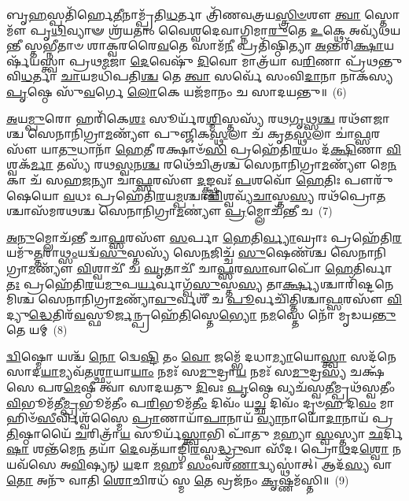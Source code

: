 𑌬𑍃\-\ul{𑌹}\-𑌸𑍍𑌪𑌤𑌿᳴𑌰𑍍\mbox{}𑌹𑍇\-\ul{𑌤𑍀}\-𑌨𑌾𑌮𑍍𑌪𑍍𑌰᳴𑌤𑌿\-\ul{𑌧}\-𑌰𑍍𑌤𑌾 𑌤𑍍𑌰𑌿᳴𑌣𑌵𑌤𑍍𑌰𑌯\-\ul{𑌸𑍍𑌤𑍍𑌰𑌿}\-\-\ul{𑍞}\-𑌶𑍗 \ul{𑌤𑍍𑌵𑌾} 𑌸𑍍𑌤𑍋𑌮𑍗᳴ 𑌪𑍃\-\ul{𑌥𑌿}\-𑌵𑍍𑌯𑌾𑍟 𑌶𑍍𑌰᳴𑌯𑌤𑌾𑌂 𑌵𑍈𑌶𑍍𑌵𑌦𑍇𑌵𑌾𑌗𑍍𑌨𑌿𑌮𑌾\-\ul{𑌰𑍁}\-𑌤𑍇 \ul{𑌉}\-𑌕𑍍𑌥𑍇 𑌅𑌵𑍍𑌯᳴𑌥𑌯𑌨𑍍𑌤𑍀 𑌸𑍍𑌤𑌭𑍍𑌨𑍀𑌤𑌾𑍞 𑌶𑌾𑌕𑍍𑌵𑌰𑌰𑍈\-\ul{𑌵}\-𑌤𑍇 𑌸𑌾𑌮᳴\-\ul{𑌨𑍀} 𑌪𑍍𑌰𑌤𑌿᳴𑌷𑍍𑌠𑌿𑌤𑍍𑌯𑌾 \ul{𑌅}\-𑌨𑍍𑌤𑌰𑌿᳴\-\ul{𑌕𑍍𑌷𑌾}\-𑌯𑌰𑍍\mbox{}𑌷᳴𑌯𑌸𑍍𑌤𑍍𑌵𑌾 𑌪𑍍𑌰𑌥\-\ul{𑌮}\-𑌜𑌾 \ul{𑌦𑍇}\-𑌵𑍇𑌷𑍁᳴ \ul{𑌦𑌿}\-𑌵𑍋 𑌮𑌾𑌤𑍍𑌰᳴𑌯𑌾 𑌵\-\ul{𑌰𑌿}\-𑌣𑌾 𑌪𑍍𑌰᳴𑌥𑌨𑍍𑌤𑍁 𑌵𑌿\-\ul{𑌧}\-𑌰𑍍𑌤𑌾 \ul{𑌚𑌾}\-𑌯𑌮𑌧𑌿᳴𑌪𑌤𑌿\-\ul{𑌶𑍍𑌚} 𑌤𑍇 \ul{𑌤𑍍𑌵𑌾} 𑌸𑌰𑍍𑌵𑍇᳴ 𑌸𑌂𑌵𑌿\-\ul{𑌦𑌾}\-𑌨𑌾 𑌨𑌾𑌕᳴𑌸𑍍𑌯 \ul{𑌪𑍃}\-𑌷𑍍𑌠𑍇 𑌸𑍁᳴\-\ul{𑌵}\-𑌰𑍍𑌗𑍇 \ul{𑌲𑍋}\-𑌕𑍇 𑌯𑌜᳴𑌮𑌾𑌨𑌂 𑌚 𑌸𑌾𑌦𑌯𑌨𑍍𑌤𑍁॥~(6)

{\anuvakamend[{\-\ul{𑌪𑍍𑌰}\-𑌤𑍀\-\ul{𑌚𑍀} 𑌦𑌿\-\ul{𑌙𑍍𑌮}\-𑌰𑍁𑌤᳴𑌸𑍍𑌤𑍇 \ul{𑌦𑍇}\-𑌵𑌾 𑌅𑌧𑌿᳴𑌪𑌤𑌯𑌶𑍍𑌚𑌤𑍍𑌵𑌾\-\ul{𑌰𑌿}\-\-\ul{𑍞}\-𑌶𑌚𑍍𑌚᳴}]}%

\-\ul{𑌅}\-𑌯\-\ul{𑌮𑍍𑌪𑍁}\-𑌰𑍋 𑌹𑌰𑌿᳴𑌕𑍇\-\ul{𑌶𑌃} 𑌸𑍂𑌰𑍍𑌯᳴𑌰\-\ul{𑌶𑍍𑌮𑌿}\-𑌸𑍍𑌤𑌸𑍍𑌯᳴ 𑌰𑌥\-\ul{𑌗𑍃}\-𑌥𑍍𑌸\-\ul{𑌶𑍍𑌚} 𑌰𑌥𑍗᳴𑌜𑌾𑌶𑍍𑌚 𑌸𑍇𑌨𑌾𑌨𑌿𑌗𑍍𑌰𑌾\-\ul{𑌮}\-𑌣𑍍𑌯𑍗᳴ 𑌪𑍁𑌞𑍍𑌜𑌿𑌕\-\ul{𑌸𑍍𑌥}\-𑌲𑌾 𑌚᳴ 𑌕𑍃𑌤\-\ul{𑌸𑍍𑌥}\-𑌲𑌾 𑌚𑌾॑\-\ul{𑌫𑍍𑌸}\-𑌰𑌸𑍗᳴ 𑌯𑌾\-\ul{𑌤𑍁}\-𑌧𑌾𑌨𑌾᳴ \ul{𑌹𑍇}\-𑌤𑍀 𑌰𑌕𑍍𑌷𑌾𑍞᳴\-\ul{𑌸𑌿} 𑌪𑍍𑌰𑌹𑍇᳴𑌤𑌿\-\ul{𑌰}\-𑌯𑌂 𑌦᳴\-\ul{𑌕𑍍𑌷𑌿}\-𑌣𑌾 \ul{𑌵𑌿}\-𑌶𑍍𑌵𑌕᳴\-\ul{𑌰𑍍𑌮𑌾} 𑌤𑌸𑍍𑌯᳴ 𑌰𑌥\-\ul{𑌸𑍍𑌵}\-𑌨\-\ul{𑌶𑍍𑌚} 𑌰𑌥𑍇᳴𑌚𑌿𑌤𑍍𑌰𑌶𑍍𑌚 𑌸𑍇𑌨𑌾𑌨𑌿𑌗𑍍𑌰𑌾\-\ul{𑌮}\-𑌣𑍍𑌯𑍗᳴ 𑌮𑍇\-\ul{𑌨}\-𑌕𑌾 𑌚᳴ 𑌸𑌹\-\ul{𑌜}\-𑌨𑍍𑌯𑌾 𑌚𑌾॑\-\ul{𑌫𑍍𑌸}\-𑌰𑌸𑍗᳴ \ul{𑌦}\-𑌙𑍍𑌕𑍍𑌷𑍍𑌣𑌵𑌃᳴ \ul{𑌪}\-𑌶𑌵𑍋᳴ \ul{𑌹𑍇}\-𑌤𑌿𑌃 𑌪𑍗𑌰𑍁᳴𑌷𑍇𑌯𑍋 \ul{𑌵}\-𑌧𑌃 𑌪𑍍𑌰𑌹𑍇᳴𑌤𑌿\-\ul{𑌰}\-𑌯\-\ul{𑌮𑍍𑌪}\-𑌶𑍍𑌚𑌾\-\ul{𑌦𑍍𑌵𑌿}\-𑌶𑍍𑌵𑌵𑍍𑌯᳴\-\ul{𑌚𑌾}\-𑌸𑍍𑌤\-\ul{𑌸𑍍𑌯} 𑌰𑌥᳴𑌪𑍍𑌰𑍋\-\ul{𑌤}\-𑌶𑍍𑌚𑌾𑌸᳴𑌮𑌰𑌥𑌶𑍍𑌚 𑌸𑍇𑌨𑌾𑌨𑌿𑌗𑍍𑌰𑌾\-\ul{𑌮}\-𑌣𑍍𑌯𑍗॑ \ul{𑌪𑍍𑌰}\-𑌮𑍍𑌲𑍋𑌚᳴𑌨𑍍𑌤𑍀 𑌚~(7)

\-\ul{𑌅}\-\-\ul{𑌨𑍁}\-𑌮𑍍𑌲𑍋𑌚᳴𑌨𑍍𑌤𑍀 𑌚𑌾\-\ul{𑌫𑍍𑌸}\-𑌰𑌸𑍗᳴ \ul{𑌸}\-𑌰𑍍𑌪𑌾 \ul{𑌹𑍇}\-𑌤𑌿\-\ul{𑌰𑍍𑌵𑍍𑌯𑌾}\-𑌘𑍍𑌰𑌾𑌃 𑌪𑍍𑌰𑌹𑍇᳴𑌤𑌿\-\ul{𑌰}\-𑌯𑌮𑍁᳴\-\ul{𑌤𑍍𑌤}\-𑌰𑌾\-\ul{𑌥𑍍𑌸𑌂}\-𑌯𑌦𑍍𑌵᳴\-\ul{𑌸𑍁}\-𑌸𑍍𑌤𑌸𑍍𑌯᳴ 𑌸𑍇\-\ul{𑌨}\-𑌜𑌿𑌚𑍍𑌚᳴ \ul{𑌸𑍁}\-𑌷𑍇𑌣᳴𑌶𑍍𑌚 𑌸𑍇𑌨𑌾𑌨𑌿𑌗𑍍𑌰𑌾\-\ul{𑌮}\-𑌣𑍍𑌯𑍗᳴ \ul{𑌵𑌿}\-𑌶𑍍𑌵𑌾𑌚𑍀᳴ 𑌚 \ul{𑌘𑍃}\-𑌤𑌾𑌚𑍀᳴ 𑌚𑌾\-\ul{𑌫𑍍𑌸}\-𑌰\-\ul{𑌸𑌾}\-𑌵𑌾𑌪𑍋᳴ \ul{𑌹𑍇}\-𑌤𑌿𑌰𑍍𑌵𑌾\-\ul{𑌤𑌃} 𑌪𑍍𑌰𑌹𑍇᳴𑌤𑌿\-\ul{𑌰}\-𑌯\-\ul{𑌮𑍁}\-𑌪\-\ul{𑌰𑍍𑌯}\-𑌰𑍍𑌵𑌾𑌗𑍍𑌵᳴\-\ul{𑌸𑍁}\-𑌸𑍍𑌤\-\ul{𑌸𑍍𑌯} 𑌤𑌾\-\ul{𑌰𑍍𑌕𑍍𑌷𑍍𑌯}\-𑌶𑍍𑌚𑌾𑌰𑌿᳴𑌷𑍍𑌟𑌨𑍇𑌮𑌿𑌶𑍍𑌚 𑌸𑍇𑌨𑌾𑌨𑌿𑌗𑍍𑌰𑌾\-\ul{𑌮}\-𑌣𑍍𑌯𑌾᳴\-\-\ul{𑌵𑍁}\-𑌰𑍍𑌵𑌶𑍀᳴ 𑌚 \ul{𑌪𑍂}\-𑌰𑍍𑌵𑌚𑌿᳴𑌤𑍍𑌤𑌿𑌶𑍍𑌚𑌾\-\ul{𑌫𑍍𑌸}\-𑌰𑌸𑍗᳴ \ul{𑌵𑌿}\-𑌦𑍍𑌯𑍁\-\ul{𑌦𑍍𑌧𑍇}\-𑌤𑌿𑌰᳴\-\ul{𑌵}\-𑌸𑍍𑌫𑍂\-\ul{𑌰𑍍𑌜}\-𑌨𑍍𑌪𑍍𑌰𑌹𑍇᳴\-\ul{𑌤𑌿}\-𑌸𑍍𑌤𑍇\-\ul{𑌭𑍍𑌯𑍋} 𑌨\-\ul{𑌮}\-𑌸𑍍𑌤𑍇 𑌨𑍋᳴ 𑌮𑍃𑌡𑌯\-\ul{𑌨𑍍𑌤𑍁} 𑌤𑍇 𑌯𑌮𑍍~(8)

\-\ul{𑌦𑍍𑌵𑌿}\-𑌷𑍍𑌮𑍋 𑌯𑌶𑍍𑌚᳴ \ul{𑌨𑍋} 𑌦𑍍𑌵𑍇\-\ul{𑌷𑍍𑌟𑌿} 𑌤𑌂 \ul{𑌵𑍋} 𑌜𑌮𑍍𑌭𑍇᳴ 𑌦𑌧𑌾\-\ul{𑌮𑍍𑌯𑌾}\-𑌯𑍋\-\ul{𑌸𑍍𑌤𑍍𑌵𑌾} 𑌸𑌦᳴𑌨𑍇 𑌸𑌾𑌦\-\ul{𑌯𑌾}\-𑌮𑍍𑌯𑌵᳴𑌤\-\ul{𑌶𑍍𑌛𑌾}\-𑌯𑌾\-\ul{𑌯𑌾𑌂} 𑌨𑌮𑌃᳴ 𑌸\-\ul{𑌮𑍁}\-𑌦𑍍𑌰𑌾\-\ul{𑌯} 𑌨𑌮𑌃᳴ 𑌸\-\ul{𑌮𑍁}\-𑌦𑍍𑌰\-\ul{𑌸𑍍𑌯} 𑌚𑌕𑍍𑌷᳴𑌸𑍇 𑌪𑌰\-\ul{𑌮𑍇}\-𑌷𑍍𑌠𑍀 𑌤𑍍𑌵𑌾᳴ 𑌸𑌾𑌦𑌯𑌤𑍁 \ul{𑌦𑌿}\-𑌵𑌃 \ul{𑌪𑍃}\-𑌷𑍍𑌠𑍇 𑌵𑍍𑌯𑌚᳴𑌸𑍍𑌵\-\ul{𑌤𑍀}\-𑌮𑍍𑌪𑍍𑌰𑌥᳴𑌸𑍍𑌵𑌤𑍀𑌂 \ul{𑌵𑌿}\-𑌭𑍂𑌮᳴𑌤𑍀\-\ul{𑌮𑍍𑌪𑍍𑌰}\-𑌭𑍂𑌮᳴𑌤𑍀𑌂 𑌪\-\ul{𑌰𑌿}\-𑌭𑍂𑌮᳴\-\ul{𑌤𑍀𑌂} 𑌦𑌿𑌵𑌂᳴ 𑌯\-\ul{𑌚𑍍𑌛} 𑌦𑌿𑌵𑌂᳴ 𑌦𑍃𑍞\-\ul{𑌹} 𑌦𑌿\-\ul{𑌵𑌂} 𑌮𑌾 𑌹𑌿𑍞᳴\-\ul{𑌸𑍀}\-𑌰𑍍𑌵𑌿𑌶𑍍𑌵᳴𑌸𑍍𑌮𑍈 \ul{𑌪𑍍𑌰𑌾}\-𑌣𑌾𑌯𑌾᳴\-\ul{𑌪𑌾}\-𑌨𑌾𑌯᳴ \ul{𑌵𑍍𑌯𑌾}\-𑌨𑌾𑌯𑍋᳴\-\ul{𑌦𑌾}\-𑌨𑌾𑌯᳴ 𑌪𑍍𑌰\-\ul{𑌤𑌿}\-𑌷𑍍𑌠𑌾𑌯𑍈᳴ \ul{𑌚}\-𑌰𑌿𑌤𑍍𑌰𑌾᳴\-\ul{𑌯} 𑌸𑍂𑌰𑍍𑌯᳴\-\ul{𑌸𑍍𑌤𑍍𑌵𑌾}\-𑌭𑌿 𑌪𑌾᳴𑌤𑍁 \ul{𑌮}\-𑌹𑍍𑌯𑌾 \ul{𑌸𑍍𑌵}\-𑌸𑍍𑌤𑍍𑌯𑌾 \ul{𑌛}\-𑌰𑍍𑌦𑌿\-\ul{𑌷𑌾} 𑌶𑌨𑍍𑌤᳴𑌮𑍇\-\ul{𑌨} 𑌤𑌯𑌾᳴ \ul{𑌦𑍇}\-𑌵𑌤᳴𑌯𑌾𑌙𑍍𑌗𑌿\-\ul{𑌰}\-𑌸𑍍𑌵\-\ul{𑌦𑍍𑌧𑍍𑌰𑍁}\-𑌵𑌾 𑌸𑍀᳴𑌦। 𑌪𑍍𑌰𑍋\-\ul{𑌥}\-𑌦\-\ul{𑌶𑍍𑌵𑍋} 𑌨 𑌯𑌵᳴𑌸𑍇 𑌅\-\ul{𑌵𑌿}\-𑌷𑍍𑌯𑌨𑍍 \ul{𑌯}\-𑌦𑌾 \ul{𑌮}\-𑌹𑌃 \ul{𑌸𑌂}\-𑌵𑌰᳴\-\ul{𑌣𑌾}\-𑌦𑍍𑌵𑍍𑌯𑌸𑍍𑌥𑌾॑𑌤𑍍। 𑌆𑌦᳴\-\ul{𑌸𑍍𑌯} 𑌵𑌾\-\ul{𑌤𑍋} 𑌅𑌨𑍁᳴ 𑌵𑌾𑌤𑌿 \ul{𑌶𑍋}\-𑌚𑌿𑌰𑌧᳴ 𑌸𑍍𑌮 \ul{𑌤𑍇} 𑌵𑍍𑌰𑌜᳴𑌨𑌂 \ul{𑌕𑍃}\-𑌷𑍍𑌣𑌮᳴𑌸𑍍𑌤𑌿॥~(9)

